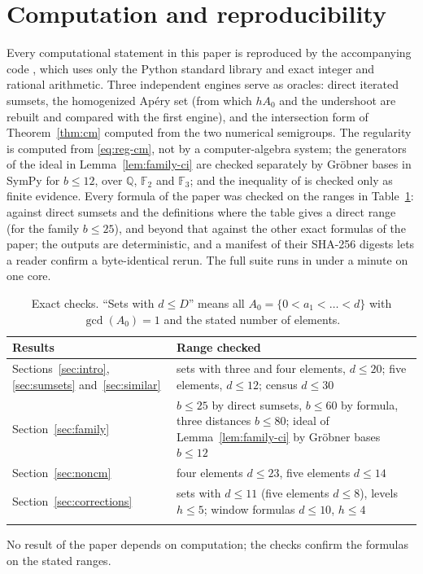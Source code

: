 \section{Computation and reproducibility}\label{sec:computation}

Every computational statement in this paper is reproduced by the accompanying code \cite{code2026}, which uses only the Python standard library and exact integer and rational arithmetic. Three independent engines serve as oracles: direct iterated sumsets, the homogenized Ap\'ery set (from which $hA_0$ and the undershoot are rebuilt and compared with the first engine), and the intersection form of Theorem~\ref{thm:cm} computed from the two numerical semigroups. The regularity is computed from \eqref{eq:reg-cm}, not by a computer-algebra system; the generators of the ideal in Lemma~\ref{lem:family-ci} are checked separately by Gr\"obner bases in SymPy \cite{SymPy2017} for $b\le12$, over $\mathbb Q$, $\mathbb F_2$ and $\mathbb F_3$; and the inequality of \cite[Theorem~A]{CompanionRegularity} is checked only as finite evidence. Every formula of the paper was checked on the ranges in Table~\ref{tab:checks}: against direct sumsets and the definitions where the table gives a direct range (for the family $b\le25$), and beyond that against the other exact formulas of the paper; the outputs are deterministic, and a manifest of their SHA-256 digests lets a reader confirm a byte-identical rerun. The full suite runs in under a minute on one core.

\begin{table}[ht]
\caption{Exact checks. ``Sets with $d\le D$'' means all $A_0=\{0<a_1<\dots<d\}$ with $\gcd(A_0)=1$ and the stated number of elements.}\label{tab:checks}
\begin{tabular}{@{}p{}p{}@{}}
\toprule
Results & Range checked \\
\midrule
Sections~\ref{sec:intro}, \ref{sec:sumsets} and~\ref{sec:similar} & sets with three and four elements, $d\le20$; five elements, $d\le12$; census $d\le30$ \\
Section~\ref{sec:family} & $b\le25$ by direct sumsets, $b\le60$ by formula, three distances $b\le80$; ideal of Lemma~\ref{lem:family-ci} by Gr\"obner bases $b\le12$ \\
Section~\ref{sec:noncm} & four elements $d\le23$, five elements $d\le14$ \\
Section~\ref{sec:corrections} & sets with $d\le11$ (five elements $d\le8$), levels $h\le5$; window formulas $d\le10$, $h\le4$ \\
\botrule
\end{tabular}
\end{table}

No result of the paper depends on computation; the checks confirm the formulas on the stated ranges.
